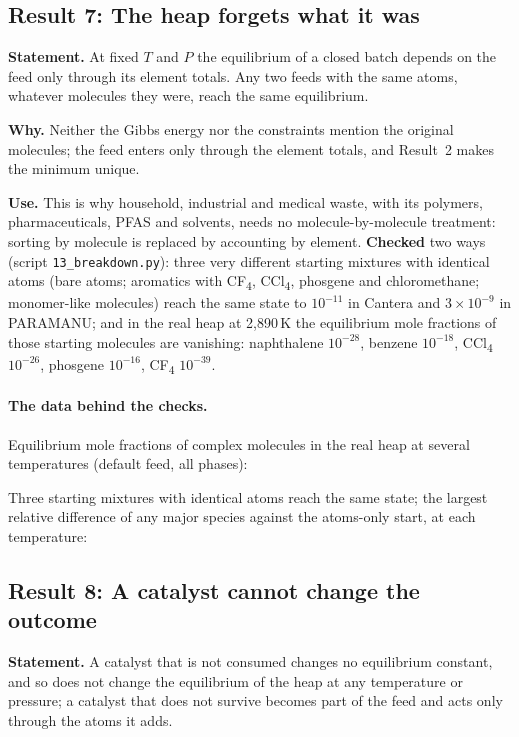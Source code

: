 \documentclass[11pt,a4paper]{article}
\begin{document}
\subsection{Result 7: The heap forgets what it was}
\textbf{Statement.} At fixed $T$ and $P$ the equilibrium of a closed batch depends on the feed only through its element totals. Any two feeds with the same atoms, whatever molecules they were, reach the same equilibrium.

\textbf{Why.} Neither the Gibbs energy nor the constraints mention the original molecules; the feed enters only through the element totals, and Result~2 makes the minimum unique.

\textbf{Use.} This is why household, industrial and medical waste, with its polymers, pharmaceuticals, PFAS and solvents, needs no molecule-by-molecule treatment: sorting by molecule is replaced by accounting by element. \textbf{Checked} two ways (script \texttt{13\_breakdown.py}): three very different starting mixtures with identical atoms (bare atoms; aromatics with CF\textsubscript{4}, CCl\textsubscript{4}, phosgene and chloromethane; monomer-like molecules) reach the same state to $10^{-11}$ in Cantera and $3\times10^{-9}$ in PARAMANU; and in the real heap at 2,890\,K the equilibrium mole fractions of those starting molecules are vanishing: naphthalene $10^{-28}$, benzene $10^{-18}$, CCl\textsubscript{4} $10^{-26}$, phosgene $10^{-16}$, CF\textsubscript{4} $10^{-39}$.

\paragraph{The data behind the checks.} Equilibrium mole fractions of complex molecules in the real heap at several temperatures (default feed, all phases):

Three starting mixtures with identical atoms reach the same state; the largest relative difference of any major species against the atoms-only start, at each temperature:


\subsection{Result 8: A catalyst cannot change the outcome}
\textbf{Statement.} A catalyst that is not consumed changes no equilibrium constant, and so does not change the equilibrium of the heap at any temperature or pressure; a catalyst that does not survive becomes part of the feed and acts only through the atoms it adds.
\end{document}
